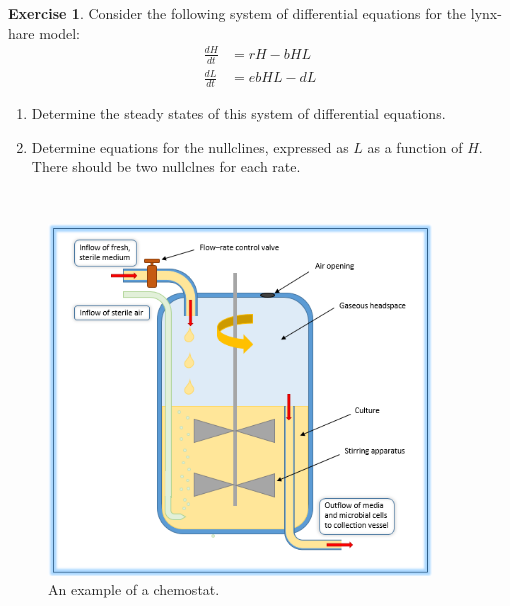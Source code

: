 \documentclass[
]{book}
\theoremstyle{definition}
\theoremstyle{definition}
\theoremstyle{definition}
\newtheorem{exercise}{Exercise}[chapter]
\theoremstyle{remark}
\begin{document}
\begin{exercise}
\protect\hypertarget{exr:unnamed-chunk-109}{}{\label{exr:unnamed-chunk-109} }Consider the following system of differential equations for the lynx-hare model:
\begin{align}
\frac{dH}{dt} &= r H - b HL \\
\frac{dL}{dt} &=ebHL -dL
\end{align}

\begin{enumerate}[label=\alph*.]
\item Determine the steady states of this system of differential equations.
\item Determine equations for the nullclines, expressed as $L$ as a function of $H$.  There should be two nullclnes for each rate. 
\end{enumerate}
\end{exercise}

~

\begin{figure}
\includegraphics[width=4in]{figures/06-coupledSystems/Chemostat_Vessel_Diagram} \caption{\label{fig:chemostat}An example of a chemostat.}\label{fig:unnamed-chunk-110}
\end{figure}
\end{document}
